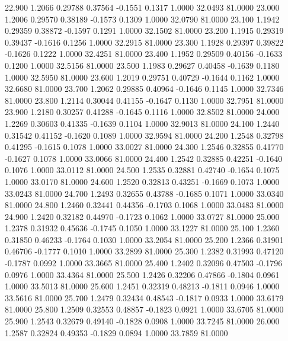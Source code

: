   22.900   1.2066   0.29788   0.37564  -0.1551   0.1317   1.0000  32.0493  81.0000
  23.000   1.2006   0.29570   0.38189  -0.1573   0.1309   1.0000  32.0790  81.0000
  23.100   1.1942   0.29359   0.38872  -0.1597   0.1291   1.0000  32.1502  81.0000
  23.200   1.1915   0.29319   0.39437  -0.1616   0.1256   1.0000  32.2915  81.0000
  23.300   1.1928   0.29397   0.39822  -0.1626   0.1222   1.0000  32.4251  81.0000
  23.400   1.1952   0.29509   0.40156  -0.1633   0.1200   1.0000  32.5156  81.0000
  23.500   1.1983   0.29627   0.40458  -0.1639   0.1180   1.0000  32.5950  81.0000
  23.600   1.2019   0.29751   0.40729  -0.1644   0.1162   1.0000  32.6680  81.0000
  23.700   1.2062   0.29885   0.40964  -0.1646   0.1145   1.0000  32.7346  81.0000
  23.800   1.2114   0.30044   0.41155  -0.1647   0.1130   1.0000  32.7951  81.0000
  23.900   1.2180   0.30257   0.41288  -0.1645   0.1116   1.0000  32.8502  81.0000
  24.000   1.2269   0.30603   0.41335  -0.1639   0.1104   1.0000  32.9013  81.0000
  24.100   1.2440   0.31542   0.41152  -0.1620   0.1089   1.0000  32.9594  81.0000
  24.200   1.2548   0.32798   0.41295  -0.1615   0.1078   1.0000  33.0027  81.0000
  24.300   1.2546   0.32855   0.41770  -0.1627   0.1078   1.0000  33.0066  81.0000
  24.400   1.2542   0.32885   0.42251  -0.1640   0.1076   1.0000  33.0112  81.0000
  24.500   1.2535   0.32881   0.42740  -0.1654   0.1075   1.0000  33.0170  81.0000
  24.600   1.2520   0.32813   0.43251  -0.1669   0.1073   1.0000  33.0243  81.0000
  24.700   1.2493   0.32655   0.43788  -0.1685   0.1071   1.0000  33.0340  81.0000
  24.800   1.2460   0.32441   0.44356  -0.1703   0.1068   1.0000  33.0483  81.0000
  24.900   1.2420   0.32182   0.44970  -0.1723   0.1062   1.0000  33.0727  81.0000
  25.000   1.2378   0.31932   0.45636  -0.1745   0.1050   1.0000  33.1227  81.0000
  25.100   1.2360   0.31850   0.46233  -0.1764   0.1030   1.0000  33.2054  81.0000
  25.200   1.2366   0.31901   0.46706  -0.1777   0.1010   1.0000  33.2899  81.0000
  25.300   1.2382   0.31993   0.47120  -0.1787   0.0992   1.0000  33.3665  81.0000
  25.400   1.2402   0.32096   0.47503  -0.1796   0.0976   1.0000  33.4364  81.0000
  25.500   1.2426   0.32206   0.47866  -0.1804   0.0961   1.0000  33.5013  81.0000
  25.600   1.2451   0.32319   0.48213  -0.1811   0.0946   1.0000  33.5616  81.0000
  25.700   1.2479   0.32434   0.48543  -0.1817   0.0933   1.0000  33.6179  81.0000
  25.800   1.2509   0.32553   0.48857  -0.1823   0.0921   1.0000  33.6705  81.0000
  25.900   1.2543   0.32679   0.49140  -0.1828   0.0908   1.0000  33.7245  81.0000
  26.000   1.2587   0.32824   0.49353  -0.1829   0.0894   1.0000  33.7859  81.0000
